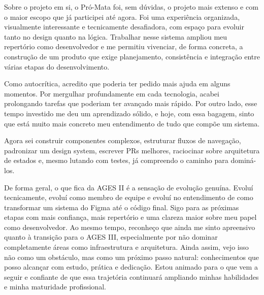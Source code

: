 Sobre o projeto em si, o Pró-Mata foi, sem dúvidas, o projeto mais
extenso e com o maior escopo que já participei até agora. Foi uma
experiência organizada, visualmente interessante e tecnicamente
desafiadora, com espaço para evoluir tanto no design quanto na lógica.
Trabalhar nesse sistema ampliou meu repertório como desenvolvedor e me
permitiu vivenciar, de forma concreta, a construção de um produto que
exige planejamento, consistência e integração entre várias etapas do
desenvolvimento.

Como autocrítica, acredito que poderia ter pedido mais ajuda em alguns
momentos. Por mergulhar profundamente em cada tecnologia, acabei
prolongando tarefas que poderiam ter avançado mais rápido. Por outro
lado, esse tempo investido me deu um aprendizado sólido, e hoje, com
essa bagagem, sinto que está muito mais concreto meu entendimento de
tudo que compõe um sistema.

Agora sei construir componentes complexos, estruturar fluxos de
navegação, padronizar um design system, escrever PRs melhores,
raciocinar sobre arquitetura de estados e, mesmo lutando com testes, já
compreendo o caminho para dominá-los.

De forma geral, o que fica da AGES II é a sensação de evolução genuína.
Evoluí tecnicamente, evoluí como membro de equipe e evoluí no
entendimento de como transformar um sistema do Figma até o código final.
Sigo para as próximas etapas com mais confiança, mais repertório e uma
clareza maior sobre meu papel como desenvolvedor. Ao mesmo tempo,
reconheço que ainda me sinto apreensivo quanto à transição para o AGES
III, especialmente por não dominar completamente áreas como
infraestrutura e arquitetura. Ainda assim, vejo isso não como um
obstáculo, mas como um próximo passo natural: conhecimentos que posso
alcançar com estudo, prática e dedicação. Estou animado para o que vem a
seguir e confiante de que essa trajetória continuará ampliando minhas
habilidades e minha maturidade profissional.


